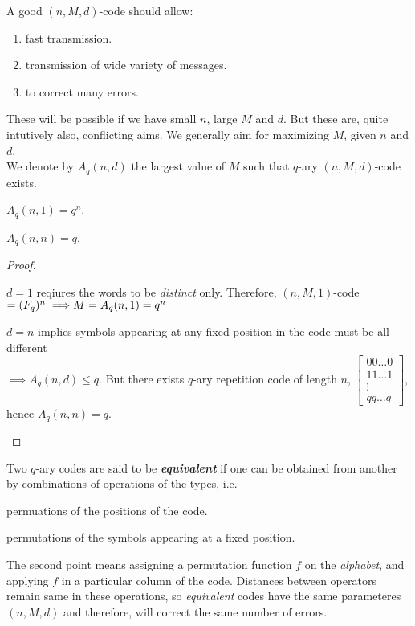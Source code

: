 \documentclass[../main.tex]{subfiles}
\begin{document}
A good $(n,M,d)$-code should allow:
\begin{enumerate}
\itemsep-1mm
	\item fast transmission.
	\item transmission of wide variety of messages.
	\item to correct many errors.
\end{enumerate}
These will be possible if we have small $n$, large $M$ and $d$. But these are, quite intutively also, conflicting aims. We generally aim for maximizing $M$, given $n$ and $d$.\\
We denote by $A_q(n,d)$ the largest value of $M$ such that $q$-ary $(n,M,d)$-code exists.

\begin{thm}
	\hfill
	\begin{enumerate*}[label=(\roman*), before=\unskip{}]
		\item $A_q(n,1)=q^n$.
		\item $A_q(n,n)=q$.
	\end{enumerate*}
\end{thm}
\begin{proof}
	\begin{enumerate*}[label=(\roman*), before=\unskip{}]
		\item $d=1$ reqiures the words to be \emph{distinct} only. Therefore, $(n,M,1)$-code $= (F_q)^n \implies\\ M=A_q(n,1)=q^n$\\ 
		\item $d=n$ implies symbols appearing at any fixed position in the code must be all different\\ $\implies A_q(n,d) \leq q$. But there exists $q$-ary repetition code of length $n$,
		$
			\begin{bmatrix}
				00\ldots 0\\
				11\ldots 1\\
				\vdots\\
				qq\ldots q
			\end{bmatrix}
		$, hence $A_q(n,n)=q$.  
	\end{enumerate*}
\end{proof}

\begin{defn}
	Two $q$-ary codes are said to be \textbf{\emph{equivalent}} if one can be obtained from another by combinations of operations of the types, i.e.
	\begin{enumerate*}[label=(\roman*), before=\unskip{}]
		\item permuations of the positions of the code.
		\item permutations of the symbols appearing at a fixed position.
	\end{enumerate*}
\end{defn}
The second point means assigning a permutation function $f$ on the \emph{alphabet}, and applying $f$ in a particular column of the code. Distances between operators remain same in these operations, so \emph{equivalent} codes have the same parameteres $(n,M,d)$ and therefore, will correct the same number of errors.
\end{document}
